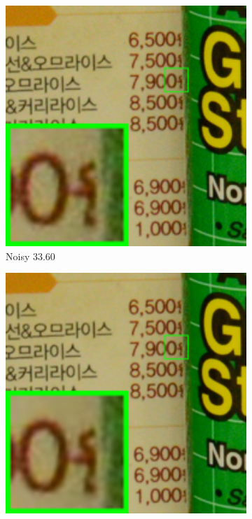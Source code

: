 \begin{figure}
    \centering
    \begin{subfigure}[t]{0.19\textwidth}
        \centering
        \includegraphics[width=1\textwidth]{images/guided/resize_br_Noisy_CC_Noisy_Nikon_D800_ISO_3200_A3_96.png}
		\caption{Noisy 33.60}
    \end{subfigure}
    \hfill
    \begin{subfigure}[t]{0.19\textwidth}
        \centering
        \includegraphics[width=1\textwidth]{images/guided/resize_br_CBM3D_CC_Noisy_Nikon_D800_ISO_3200_A3_96.png}

\end{subfigure}
\end{figure}
